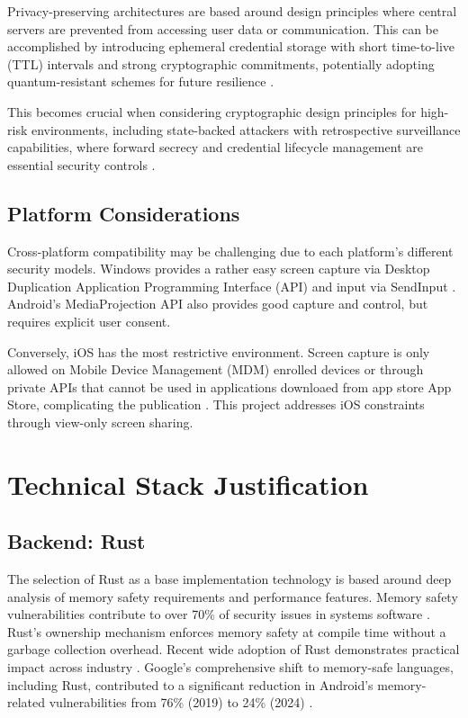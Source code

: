 \documentclass[12pt,a4paper]{article}
\begin{document}
Privacy-preserving architectures are based around design principles where central servers are prevented from accessing user data or communication. This can be accomplished by introducing ephemeral credential storage with short time-to-live (TTL) intervals and strong cryptographic commitments, potentially adopting quantum-resistant schemes for future resilience \cite{NIST24}.

This becomes crucial when considering cryptographic design principles for high-risk environments, including state-backed attackers with retrospective surveillance capabilities, where forward secrecy and credential lifecycle management are essential security controls \cite{NIST_SP80052}.

\subsection{Platform Considerations}

Cross-platform compatibility may be challenging due to each platform's different security models. Windows provides a rather easy screen capture via Desktop Duplication Application Programming Interface (API) \cite{stev21} and input via SendInput \cite{WinInput}. Android's MediaProjection API \cite{AD25} also provides good capture and control, but requires explicit user consent.

Conversely, iOS has the most restrictive environment. Screen capture is only allowed on Mobile Device Management (MDM) enrolled \cite{AS25} devices or through private APIs that cannot be used in applications downloaed from app store App Store, complicating the publication \cite{Intune25}. This project addresses iOS constraints through view-only screen sharing.

\section{Technical Stack Justification}

\subsection{Backend: Rust}

The selection of Rust \cite{Buch21} as a base implementation technology is based around deep analysis of memory safety requirements and performance features. Memory safety vulnerabilities contribute to over 70\% of security issues in systems software \cite{CC19}. Rust's ownership mechanism enforces memory safety at compile time without a garbage collection overhead. Recent wide adoption of Rust demonstrates practical impact across industry \cite{IN25, MS19b}. Google's comprehensive shift to memory-safe languages, including Rust, contributed to a significant reduction in Android's memory-related vulnerabilities from 76\% (2019) to 24\% (2024) \cite{Goo25}.
\end{document}
